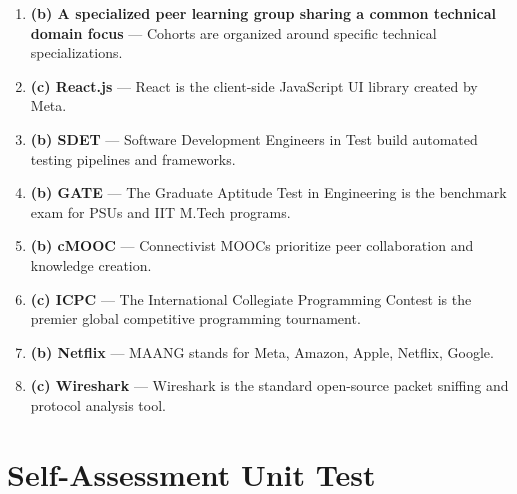 \begin{solutionbox}
\begin{enumerate}
    \item \textbf{(b) A specialized peer learning group sharing a common technical domain focus} --- Cohorts are organized around specific technical specializations.
    \item \textbf{(c) React.js} --- React is the client-side JavaScript UI library created by Meta.
    \item \textbf{(b) SDET} --- Software Development Engineers in Test build automated testing pipelines and frameworks.
    \item \textbf{(b) GATE} --- The Graduate Aptitude Test in Engineering is the benchmark exam for PSUs and IIT M.Tech programs.
    \item \textbf{(b) cMOOC} --- Connectivist MOOCs prioritize peer collaboration and knowledge creation.
    \item \textbf{(c) ICPC} --- The International Collegiate Programming Contest is the premier global competitive programming tournament.
    \item \textbf{(b) Netflix} --- MAANG stands for Meta, Amazon, Apple, Netflix, Google.
    \item \textbf{(c) Wireshark} --- Wireshark is the standard open-source packet sniffing and protocol analysis tool.
\end{enumerate}
\end{solutionbox}

\section{Self-Assessment Unit Test}

